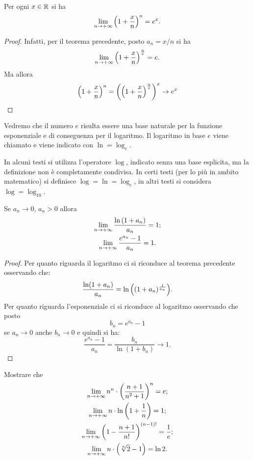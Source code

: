 \begin{corollary}
Per ogni $x\in \mathbb R$ si ha
\[
  \lim_{n\to +\infty} {\left( 1+ \frac x n \right)}^n = e^x.
\]
\end{corollary}
%
\begin{proof}
Infatti, per il teorema precedente, posto $a_n = x/n$ si ha
\[
\lim_{n\to +\infty}{\left( 1+\frac x n \right)}^{\frac n x} = e.
\]
Ma allora
\[
{\left( 1+ \frac x n \right)}^n = {\left( {\left( 1+\frac x n \right)}^{\frac n x} \right)}^x
\to e^x
\]
\end{proof}

\begin{definition}
Vedremo che il numero $e$ risulta essere una base naturale per la funzione
esponenziale e di conseguenza per il logaritmo. Il logaritmo in base
$e$ viene chiamato  e viene indicato con $\ln = \log_e$.
\end{definition}

In alcuni testi si utilizza l'operatore $\log$, indicato senza una base esplicita,
ma la definizione non è completamente condivisa.
In certi testi (per lo più in ambito matematico)
si definisce $\log  = \ln = \log_e$,
in altri testi si considera $\log = \log_{10}$.

\begin{corollary}
\mymark{*}%
Se $a_n \to 0$, $a_n>0$ allora
\begin{gather}
 \lim_{n\to +\infty} \frac{\ln {\left( 1+ a_n \right)}}{a_n} = 1; \\
 \lim_{n\to +\infty} \frac{e^{a_n}-1}{a_n} = 1.
\end{gather}
\end{corollary}
%
\begin{proof}
Per quanto riguarda il logaritmo ci si riconduce al teorema precedente
osservando che:
\[
  \frac{\ln(1+a_n)}{a_n}
  = \ln {\left( (1+a_n)^{\frac 1 {a_n}} \right)}.
\]
Per quanto riguarda l'esponenziale ci si riconduce al logaritmo
osservando che posto
\[
  b_n = e^{a_n}-1
\]
se $a_n\to 0$ anche $b_n\to 0$ e quindi si ha:
\[
\frac{e^{a_n}-1}{a_n} = \frac{b_n}{\ln(1+b_n)} \to 1.
\]

\end{proof}

\begin{exercise}
Mostrare che
\begin{gather*}
  \lim_{n\to+\infty} n^n\cdot {\left( \frac{n+1}{n^2+1} \right)}^n = e; \\
  \lim_{n\to+\infty} n\cdot \ln{\left( 1 + \frac 1 n \right)} = 1; \\
  \lim_{n\to+\infty} {\left( 1-\frac{n+1}{n!} \right)}^{(n-1)!} = \frac 1 e; \\
  \lim_{n\to+\infty} n \cdot {\left( \sqrt[n]{2}-1 \right)} = \ln 2.
\end{gather*}
\end{exercise}

